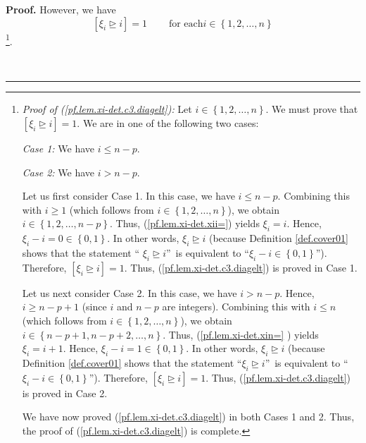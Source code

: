 \documentclass
[numbers=enddot,12pt,final,onecolumn,notitlepage,english]{scrartcl}%
\theoremstyle{definition}
\newenvironment{proof}[1][Proof]{\noindent\textbf{#1.} }{\ \rule{0.5em}{0.5em}}
\newenvironment{verlong}{}{}
\begin{document}
\begin{proof}
\begin{verlong}
However, we have
\begin{equation}
\left[  \xi_{i}\trianglerighteq i\right]  =1\ \ \ \ \ \ \ \ \ \ \text{for each
}i\in\left\{  1,2,\ldots,n\right\}  \label{pf.lem.xi-det.c3.diagelt}%
\end{equation}
\footnote{\textit{Proof of (\ref{pf.lem.xi-det.c3.diagelt}):} Let
$i\in\left\{  1,2,\ldots,n\right\}  $. We must prove that $\left[  \xi
_{i}\trianglerighteq i\right]  =1$. We are in one of the following two cases:
\par
\textit{Case 1:} We have $i\leq n-p$.
\par
\textit{Case 2:} We have $i>n-p$.
\par
Let us first consider Case 1. In this case, we have $i\leq n-p$. Combining
this with $i\geq1$ (which follows from $i\in\left\{  1,2,\ldots,n\right\}  $),
we obtain $i\in\left\{  1,2,\ldots,n-p\right\}  $. Thus,
(\ref{pf.lem.xi-det.xii=}) yields $\xi_{i}=i$. Hence, $\xi_{i}-i=0\in\left\{
0,1\right\}  $. In other words, $\xi_{i}\trianglerighteq i$ (because
Definition \ref{def.cover01} shows that the statement \textquotedblleft%
$\xi_{i}\trianglerighteq i$\textquotedblright\ is equivalent to
\textquotedblleft$\xi_{i}-i\in\left\{  0,1\right\}  $\textquotedblright).
Therefore, $\left[  \xi_{i}\trianglerighteq i\right]  =1$. Thus,
(\ref{pf.lem.xi-det.c3.diagelt}) is proved in Case 1.
\par
Let us next consider Case 2. In this case, we have $i>n-p$. Hence, $i\geq
n-p+1$ (since $i$ and $n-p$ are integers). Combining this with $i\leq n$
(which follows from $i\in\left\{  1,2,\ldots,n\right\}  $), we obtain
$i\in\left\{  n-p+1,n-p+2,\ldots,n\right\}  $. Thus, (\ref{pf.lem.xi-det.xin=}%
) yields $\xi_{i}=i+1$. Hence, $\xi_{i}-i=1\in\left\{  0,1\right\}  $. In
other words, $\xi_{i}\trianglerighteq i$ (because Definition \ref{def.cover01}
shows that the statement \textquotedblleft$\xi_{i}\trianglerighteq
i$\textquotedblright\ is equivalent to \textquotedblleft$\xi_{i}-i\in\left\{
0,1\right\}  $\textquotedblright). Therefore, $\left[  \xi_{i}\trianglerighteq
i\right]  =1$. Thus, (\ref{pf.lem.xi-det.c3.diagelt}) is proved in Case 2.
\par
We have now proved (\ref{pf.lem.xi-det.c3.diagelt}) in both Cases 1 and 2.
Thus, the proof of (\ref{pf.lem.xi-det.c3.diagelt}) is complete.}.


\end{verlong}
\end{proof}
\end{document}
